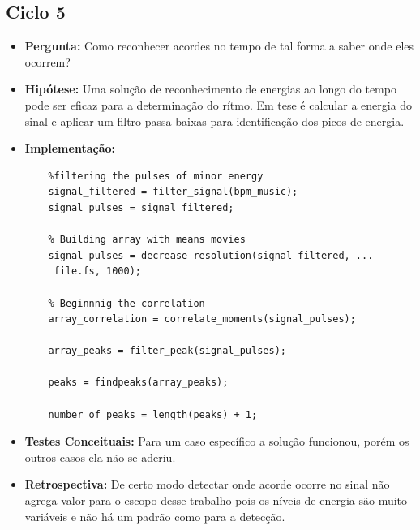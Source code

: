 \subsection{Ciclo 5}
\begin{itemize}
\item \textbf{Pergunta:} Como reconhecer acordes no tempo de tal forma a saber onde eles ocorrem?
\item \textbf{Hipótese:} Uma solução de reconhecimento de energias ao longo do tempo pode ser eficaz para a determinação do rítmo. Em tese é calcular a energia do sinal e aplicar um filtro passa-baixas para identificação dos picos de energia.
\item \textbf{Implementação:} 
\begin{lstlisting}
    %filtering the pulses of minor energy
    signal_filtered = filter_signal(bpm_music);
    signal_pulses = signal_filtered;

    % Building array with means movies
    signal_pulses = decrease_resolution(signal_filtered, ...
     file.fs, 1000);

    % Beginnnig the correlation
    array_correlation = correlate_moments(signal_pulses);

    array_peaks = filter_peak(signal_pulses);

    peaks = findpeaks(array_peaks);

    number_of_peaks = length(peaks) + 1;

\end{lstlisting}
\item \textbf{Testes Conceituais:} Para um caso específico a solução funcionou, porém os outros casos ela não se aderiu.    
\item \textbf{Retrospectiva:} De certo modo detectar onde acorde ocorre no sinal não agrega valor para o escopo desse trabalho pois os níveis de energia são muito variáveis e não há um padrão como para a detecção.
\end{itemize} 

